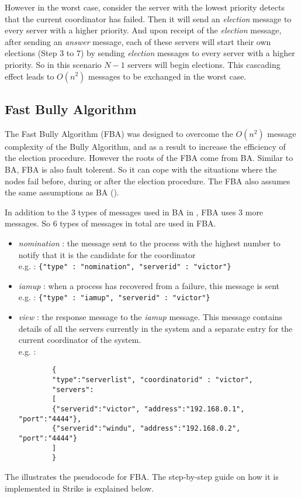 \documentclass[dareport.tex]{subfiles}
\begin{document}
However in the worst case, consider the server with the lowest priority detects that the current coordinator has failed. Then it will send an \emph{election} message to every server with a higher priority. And upon receipt of the \emph{election} message, after sending an \emph{answer} message, each of these servers will start their own elections (Step 3 to 7) by sending \emph{election} messages to every server with a higher priority. So in this scenario $ N-1 $ servers will begin elections. This cascading effect leads to $ O(n^2) $ messages to be exchanged in the worst case.

\subsection{Fast Bully Algorithm} \label{ssec:fast-bully}
The Fast Bully Algorithm (FBA)\cite{fastbully} was designed to overcome the $ O(n^2) $ message complexity of the Bully Algorithm, and as a result to increase the efficiency of the election procedure. However the roots of the FBA come from BA. Similar to BA, FBA is also fault tolerent. So it can cope with the situations where the nodes fail before, during or after the election procedure. The FBA also assumes the same assumptions as BA ().

In addition to the 3 types of messages used in BA in , FBA uses 3 more messages. So 6 types of messages in total are used in FBA.
\begin{itemize}\label{fba-message-types}
	\item \emph{nomination} : the message sent to the process with the highest number to notify that it is the candidate for the coordinator\\
	e.g. : \verb|{"type" : "nomination", "serverid" : "victor"}|
	\item \emph{iamup} : when a process has recovered from a failure, this message is sent\\
	e.g. : \verb|{"type" : "iamup", "serverid" : "victor"}|
	\item \emph{view} : the response message to the \emph{iamup} message. This message contains details of all the servers currently in the system and a separate entry for the current coordinator of the system.\\
	e.g. :
	\begin{small}
		\begin{verbatim}
		{
		"type":"serverlist", "coordinatorid" : "victor",
		"servers": 
		[ 	
		{"serverid":"victor", "address":"192.168.0.1", "port":"4444"}, 
		{"serverid":"windu", "address":"192.168.0.2", "port":"4444"} 
		]
		}
		\end{verbatim}
	\end{small}
\end{itemize}
The  illustrates the pseudocode for FBA. The step-by-step guide on how it is implemented in Strike is explained below.
\end{document}
